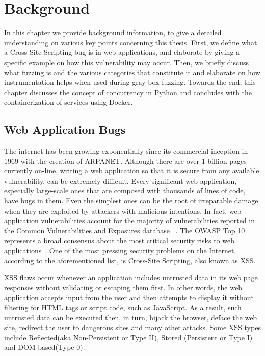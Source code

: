 \chapter{Background}
\label{sec:background}
\minitoc
\vspace*{1cm}

In this chapter we provide background information, to give a detailed understanding on various key points concerning this thesis. First, we define what a Cross-Site Scripting bug is in web applications, and elaborate by giving a specific example on how this vulnerability may occur. Then, we briefly discuss what fuzzing is and the various categories that constitute it and elaborate on how instrumentation helps when used during gray box fuzzing. Towards the end, this chapter discusses the concept of concurrency in Python and concludes with the containerization of services using Docker.

\section{Web Application Bugs}
The internet has been growing exponentially since its commercial inception in 1969 with the creation of ARPANET. Although there are over 1 billion pages currently on-line, writing a web application so that it is secure from any available vulnerability, can be extremely difficult. Every significant web application, especially large-scale ones that are composed with thousands of lines of code, have bugs in them. Even the simplest ones can be the root of irreparable damage when they are exploited by attackers with malicious intentions. In fact, web application vulnerabilities account for the majority of vulnerabilities reported in the Common Vulnerabilities and Exposures database ~\cite{cve}. The OWASP Top 10 represents a broad consensus about the most critical security risks to web applications~\cite{owasp2017}. One of the most pressing security problems on the Internet, according to the aforementioned list, is Cross-Site Scripting, also known as XSS.

XSS flaws occur whenever an application includes untrusted data in its web page responses without validating or escaping them first. In other words, the web application accepts input from the user and then attempts to display it without filtering for HTML tags or script code, such as JavaScript. As a result, such untrusted data can be executed then, in turn, hijack the browser, deface the web site, redirect the user to dangerous sites and many other attacks. Some XSS types include Reflected(aka Non-Persistent or Type II), Stored (Persistent or Type I) and DOM-based(Type-0).

